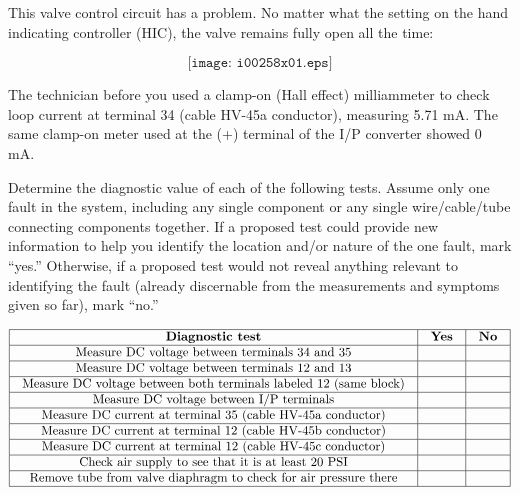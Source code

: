 

This valve control circuit has a problem.  No matter what the setting on the hand indicating controller (HIC), the valve remains fully open all the time:

$$\texttt{[image: i00258x01.eps]}$$

The technician before you used a clamp-on (Hall effect) milliammeter to check loop current at terminal 34 (cable HV-45a conductor), measuring 5.71 mA.  The same clamp-on meter used at the (+) terminal of the I/P converter showed 0 mA.

Determine the diagnostic value of each of the following tests.  Assume only one fault in the system, including any single component or any single wire/cable/tube connecting components together.  If a proposed test could provide new information to help you identify the location and/or nature of the one fault, mark ``yes.''  Otherwise, if a proposed test would not reveal anything relevant to identifying the fault (already discernable from the measurements and symptoms given so far), mark ``no.''


$$\vbox{\offinterlineskip
\halign{\strut
\vrule \quad\hfil # \ \hfil & 
\vrule \quad\hfil # \ \hfil & 
\vrule \quad\hfil # \ \hfil \vrule \cr
\noalign{\hrule}
%
{\bf Diagnostic test} & {\bf Yes} & {\bf No} \cr
%
\noalign{\hrule}
%
Measure DC voltage between terminals 34 and 35 &  &  \cr
%
\noalign{\hrule}
%
Measure DC voltage between terminals 12 and 13 &  &  \cr
%
\noalign{\hrule}
%
Measure DC voltage between both terminals labeled 12 (same block) &  &  \cr
%
\noalign{\hrule}
%
Measure DC voltage between I/P terminals &  &  \cr
%
\noalign{\hrule}
%
Measure DC current at terminal 35 (cable HV-45a conductor) &  &  \cr
%
\noalign{\hrule}
%
Measure DC current at terminal 12 (cable HV-45b conductor) &  &  \cr
%
\noalign{\hrule}
%
Measure DC current at terminal 12 (cable HV-45c conductor) &  &  \cr
%
\noalign{\hrule}
%
Check air supply to see that it is at least 20 PSI &  &  \cr
%
\noalign{\hrule}
%
Remove tube from valve diaphragm to check for air pressure there &  &  \cr
%
\noalign{\hrule}
} %
}$$ %

